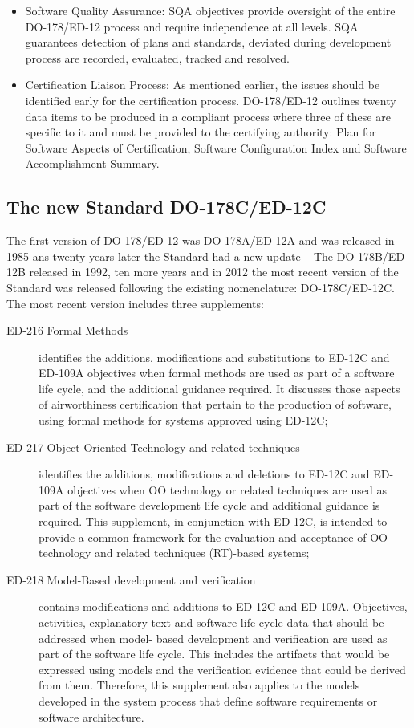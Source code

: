 {\begin{description}
\begin{itemize}
or configuration is the design of the DO-178/ED-12 objectives
for configuration management.
\item Software Quality Assurance: \ac{SQA} objectives provide oversight of the entire DO-178/ED-12
process and require independence at all levels. \ac{SQA} guarantees
detection of plans and standards, deviated during development
process are recorded, evaluated, tracked and resolved.
\item Certification Liaison Process: As mentioned earlier, the
issues should be identified early for the certification process.
DO-178/ED-12 outlines twenty data items to be produced in a
compliant process where three of these are specific to it and
must be provided to the certifying authority: Plan for Software Aspects of Certification, Software Configuration Index and Software Accomplishment Summary.
\end{itemize}
\end{description}
\subsection{The new Standard DO-178C/ED-12C}
The first version of DO-178/ED-12 was DO-178A/ED-12A and was released in 1985 ans twenty years later the Standard had a new update -- The DO-178B/ED-12B released in 1992,
ten more years and in 2012 the most recent version of the Standard was released following the existing nomenclature: DO-178C/ED-12C.
The most recent version includes three supplements: 
\begin{description}
\item[ED-216 Formal Methods] identifies the additions, modifications and substitutions to ED-12C and ED-109A objectives when formal methods are used as part of a software life cycle, and the additional guidance required. It discusses those aspects of airworthiness certification that pertain to the production of software, using formal methods for systems approved using ED-12C;
\item[ED-217 Object-Oriented Technology and related techniques] identifies the additions, modifications and deletions to ED-12C and ED-109A objectives when \ac{OO} technology or related techniques are used as part of the software development life cycle and additional guidance is required. This supplement, in conjunction with ED-12C, is intended to provide a common framework for the evaluation and acceptance of \ac{OO} technology and related techniques (RT)-based systems;
\item[ED-218 Model-Based development and verification] contains modifications and additions to ED-12C and ED-109A. Objectives, activities, explanatory text and software life cycle data that should be addressed when model- based development and verification are used as part of the software life cycle. This includes the artifacts that would be expressed using models and the verification evidence that could be derived from them. Therefore, this supplement also applies to the models developed in the system process that define software requirements or software architecture.
\end{description}

}
